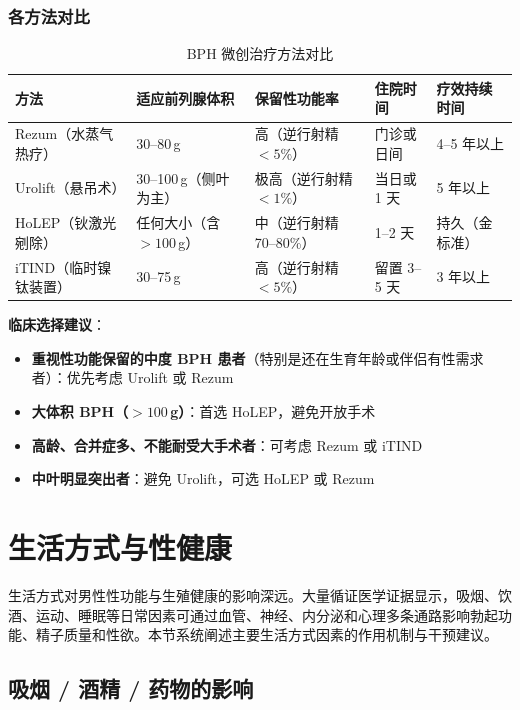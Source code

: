 \subsubsection{各方法对比}

\begin{table}[htbp]
\centering
\caption{BPH 微创治疗方法对比}
\label{tab:bph_minimal_invasive}
\begin{tabularx}{\textwidth}{@{}lXXXX@{}}
    \toprule
    \textbf{方法} & \textbf{适应前列腺体积} & \textbf{保留性功能率} & \textbf{住院时间} & \textbf{疗效持续时间} \\
    \midrule
    Rezum（水蒸气热疗） & 30--80\,g & 高（逆行射精 $<5\%$） & 门诊或日间 & 4--5 年以上 \\
    Urolift（悬吊术） & 30--100\,g（侧叶为主） & 极高（逆行射精 $<1\%$） & 当日或 1 天 & 5 年以上 \\
    HoLEP（钬激光剜除） & 任何大小（含 $>100$\,g） & 中（逆行射精 70--80\%） & 1--2 天 & 持久（金标准） \\
    iTIND（临时镍钛装置） & 30--75\,g & 高（逆行射精 $<5\%$） & 留置 3--5 天 & 3 年以上 \\
    \bottomrule
\end{tabularx}
\end{table}

\noindent\textbf{临床选择建议}：
\begin{itemize}[leftmargin=2cm]
	\item \textbf{重视性功能保留的中度 BPH 患者}（特别是还在生育年龄或伴侣有性需求者）：优先考虑 Urolift 或 Rezum
	\item \textbf{大体积 BPH（$>100$\,g）}：首选 HoLEP，避免开放手术
	\item \textbf{高龄、合并症多、不能耐受大手术者}：可考虑 Rezum 或 iTIND
	\item \textbf{中叶明显突出者}：避免 Urolift，可选 HoLEP 或 Rezum
\end{itemize}

\section{生活方式与性健康}

生活方式对男性性功能与生殖健康的影响深远。大量循证医学证据显示，吸烟、饮酒、运动、睡眠等日常因素可通过血管、神经、内分泌和心理多条通路影响勃起功能、精子质量和性欲。本节系统阐述主要生活方式因素的作用机制与干预建议。

\subsection{吸烟 / 酒精 / 药物的影响}

